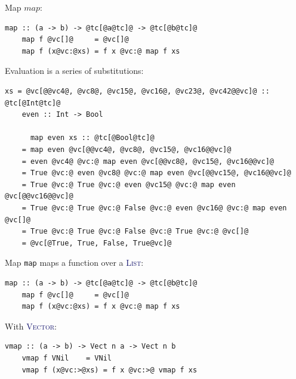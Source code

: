 \documentclass[xcolor={usenames,dvipsnames}]{beamer}
\newcommand{\htycon}[1]{\textcolor{MidnightBlue}{\textsc{#1}}}
\begin{document}
\begin{frame}[fragile]{Map}
  $map$:
  \begin{lstlisting}[style=hask]
    map :: (a -> b) -> @tc[@a@tc]@ -> @tc[@b@tc]@
    map f @vc[]@     = @vc[]@
    map f (x@vc:@xs) = f x @vc:@ map f xs
  \end{lstlisting}

  Evaluation is a series of substitutions:
  \begin{lstlisting}[style=hask]
    xs = @vc[@@vc4@, @vc8@, @vc15@, @vc16@, @vc23@, @vc42@@vc]@ :: @tc[@Int@tc]@
    even :: Int -> Bool

      map even xs :: @tc[@Bool@tc]@
    = map even @vc[@@vc4@, @vc8@, @vc15@, @vc16@@vc]@
    = even @vc4@ @vc:@ map even @vc[@@vc8@, @vc15@, @vc16@@vc]@
    = True @vc:@ even @vc8@ @vc:@ map even @vc[@@vc15@, @vc16@@vc]@
    = True @vc:@ True @vc:@ even @vc15@ @vc:@ map even @vc[@@vc16@@vc]@
    = True @vc:@ True @vc:@ False @vc:@ even @vc16@ @vc:@ map even @vc[]@
    = True @vc:@ True @vc:@ False @vc:@ True @vc:@ @vc[]@
    = @vc[@True, True, False, True@vc]@
  \end{lstlisting}
\end{frame}

\begin{frame}[fragile]{Map}
  \texttt{map} maps a function over a \htycon{List}:
  \begin{lstlisting}[style=hask]
    map :: (a -> b) -> @tc[@a@tc]@ -> @tc[@b@tc]@
    map f @vc[]@     = @vc[]@
    map f (x@vc:@xs) = f x @vc:@ map f xs
  \end{lstlisting}

  With \htycon{Vector}:
  \begin{lstlisting}[style=hask]
    vmap :: (a -> b) -> Vect n a -> Vect n b
    vmap f VNil    = VNil
    vmap f (x@vc:>@xs) = f x @vc:>@ vmap f xs
  \end{lstlisting}
\end{frame}
\end{document}

